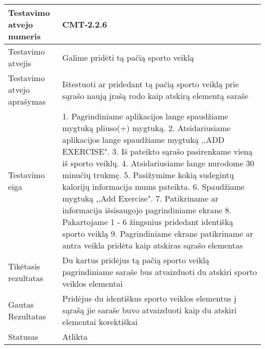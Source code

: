 \documentclass[oneside]{VUMIFPSkursinis}
\begin{document}
\begin{center}
    \begin{tabular}{ |p{5cm}|p{13cm}|}
    \hline
        Testavimo atvejo numeris &  CMT-2.2.6\\ \hline
        Testavimo atvejis & Galime pridėti tą pačią sporto veiklą  \\ \hline
        Testavimo atvejo aprašymas & Ištestuoti ar pridedant tą pačią sporto veiklą prie sąrašo naują įrašą rodo kaip atskirą elementą saraše  \\ \hline
        Testavimo eiga &  1. Pagrindiniame aplikacijos lange spaudžiame mygtuką pliuso(+) mygtuką. 
				2. Atsidariusiame aplikacijos lange spaudžiame mygtuką ,,ADD EXERCISE". 
				3. Iš pateikto sąrašo pasirenkame vieną iš sporto veiklų. 
				4. Atsidariusiame lange nurodome 30 minučių trukmę.
				5. Pasižymime kokią sudegintų kalorijų informacija mums pateikta. 
				6. Spaudžiame mygtuką ,,Add Exercise".
				7. Patikriname ar informacija išsisaugojo pagrindiniame ekrane 
				8. Pakartojame 1 - 6 žingsnius pridedant identišką sporto veiklą
				9. Pagrindiniame ekrane patikriname ar antra veikla pridėta kaip atskiras sąrašo elementas \\ \hline
        Tikėtasis rezultatas &  Du kartus pridėjus tą pačią sporto veiklą pagrindiniame saraše bus atvaizduoti du atskiri sporto veiklos elementai\\ \hline
        Gautas Rezultatas &  Pridėjus du identiškus sporto veiklos elementus į sąrašą jie saraše buvo atvaizduoti kaip du atskiri elementai korektiškai\\ \hline
        Statusas & Atlikta \\ \hline
    \hline
    \end{tabular}
\end{center}
\end{document}
